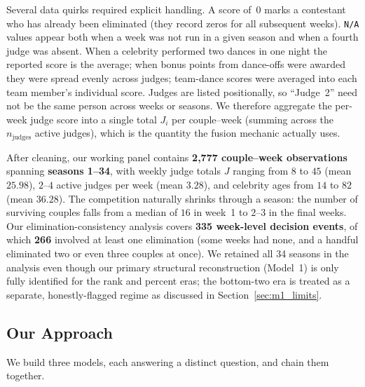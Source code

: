 \documentclass{article}
\begin{document}
Several data quirks required explicit handling. A score of~$0$ marks a contestant who has
already been eliminated (they record zeros for all subsequent weeks). \texttt{N/A} values
appear both when a week was not run in a given season and when a fourth judge was absent.
When a celebrity performed two dances in one night the reported score is the average; when
bonus points from dance-offs were awarded they were spread evenly across judges; team-dance
scores were averaged into each team member's individual score. Judges are listed positionally,
so ``Judge~2'' need not be the same person across weeks or seasons. We therefore aggregate
the per-week judge score into a single total $J_{i}$ per couple--week (summing across the
$n_{\text{judges}}$ active judges), which is the quantity the fusion mechanic actually uses.

After cleaning, our working panel contains \textbf{2{,}777 couple--week observations}
spanning \textbf{seasons 1--34}, with weekly judge totals $J$ ranging from $8$ to $45$
(mean $25.98$), $2$--$4$ active judges per week (mean $3.28$), and celebrity ages from
$14$ to $82$ (mean $36.28$). The competition naturally shrinks through a season: the number
of surviving couples falls from a median of $16$ in week~1 to $2$--$3$ in the final weeks.
Our elimination-consistency analysis covers \textbf{335 week-level decision events}, of
which \textbf{266} involved at least one elimination (some weeks had none, and a handful
eliminated two or even three couples at once). We retained all 34 seasons in the analysis
even though our primary structural reconstruction (Model~1) is only fully identified for
the rank and percent eras; the bottom-two era is treated as a separate, honestly-flagged
regime as discussed in Section~\ref{sec:m1_limits}.

\subsection{Our Approach}

We build three models, each answering a distinct question, and chain them together.
\end{document}
